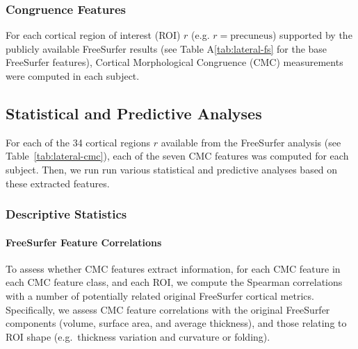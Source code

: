 \documentclass{article}
\begin{document}
\subsubsection{Congruence Features}
\label{sec:cmc-features}

For each cortical region of interest (ROI) \(r\) (e.g.
\(r=\text{precuneus}\)) supported by the publicly available FreeSurfer
results (see Table A\ref{tab:lateral-fs} for the base FreeSurfer features),
Cortical Morphological Congruence (CMC) measurements were computed in each
subject.

%


\subsection{Statistical and Predictive Analyses}

For each of the 34 cortical regions \(r\) available from the FreeSurfer
analysis (see Table~\ref{tab:lateral-cmc}), each of the seven CMC features was
computed for each subject. Then, we run run various statistical and
predictive analyses based on these extracted features.

\subsubsection{Descriptive Statistics}


\paragraph{FreeSurfer Feature Correlations} To assess whether CMC features
extract  information, for each CMC feature in each CMC
feature class, and each ROI, we compute the Spearman correlations with a
number of potentially related original FreeSurfer cortical metrics.
Specifically, we assess CMC feature correlations with the original FreeSurfer
components (volume, surface area, and average thickness), and those relating
to ROI shape (e.g.\ thickness variation and curvature or folding).

%
\end{document}
